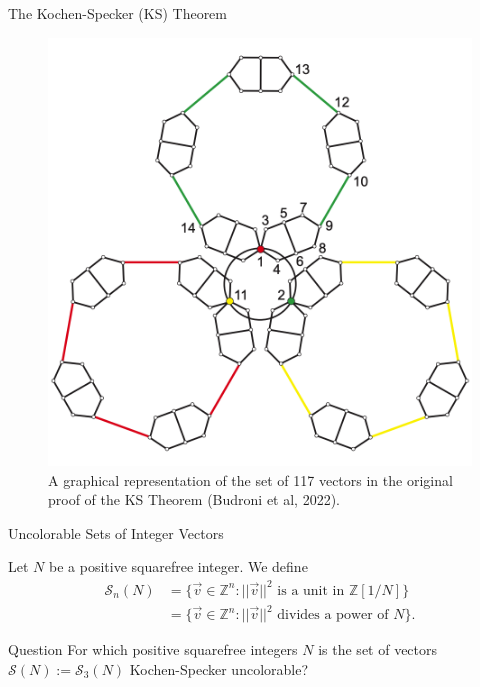 \documentclass[11pt]{beamer}
\begin{document}
\begin{frame}{The Kochen-Specker (KS) Theorem}

\centering

\begin{figure}
	\includegraphics[width=0.65 \textwidth]{Kochen-Specker sets}
	
	\caption{A graphical representation of the set of 117 vectors in the original proof of the KS Theorem (Budroni et al, 2022).}
	
\end{figure}

\end{frame}

{
	\begin{frame}{}
	\end{frame}
}
{
	\begin{frame}{}
	\end{frame}
}
\begin{frame}{Uncolorable Sets of Integer Vectors}

\pause

Let $N$ be a positive squarefree integer. We define
\begin{equation*}
	\begin{split}
		\mathcal{S}_{n} (N) &= \{\vec{v} \in \mathbb{Z}^{n} : ||\vec{v}||^{2} \text{ is a unit in } \mathbb{Z}[1/N]\} \\
		&= \{\vec{v} \in \mathbb{Z}^{n} : ||\vec{v}||^{2} \text{ divides a power of } N\}.
	\end{split}
\end{equation*}

\pause

\begin{alertblock}{Question}
	For which positive squarefree integers $N$ is the set of vectors $\mathcal{S}(N) := \mathcal{S}_{3} (N)$ Kochen-Specker uncolorable?
\end{alertblock}

\end{frame}
\end{document}
